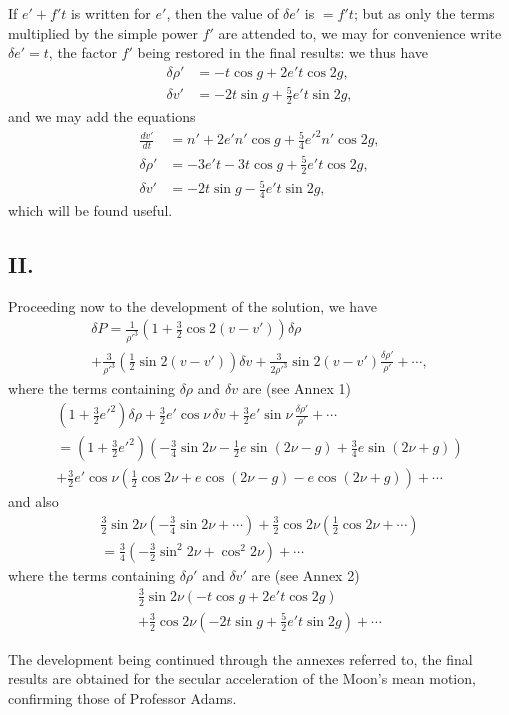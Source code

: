 \documentclass[11pt,a4paper]{article}
\begin{document}
If $e' + f't$ is written for $e'$, then the value of $\delta e'$ is $= f't$; but as only the terms multiplied by the simple power $f'$ are attended to, we may for convenience write $\delta e' = t$, the factor $f'$ being restored in the final results: we thus have
\begin{align*}
\delta\rho' &= -t\cos g + 2e't\cos 2g, \\
\delta v' &= -2t\sin g + \tfrac{5}{2}e't\sin 2g,
\end{align*}
and we may add the equations
\begin{align*}
\frac{dv'}{dt} &= n' + 2e'n'\cos g + \tfrac{5}{4}e'^2n'\cos 2g, \\
\delta\rho' &= -3e't - 3t\cos g + \tfrac{5}{2}e't\cos 2g, \\
\delta v' &= -2t\sin g - \tfrac{5}{4}e't\sin 2g,
\end{align*}
which will be found useful.

\subsection*{II.}

Proceeding now to the development of the solution, we have
\begin{multline}
\delta P = \frac{1}{\rho'^3}\left(1 + \tfrac{3}{2}\cos 2(v-v')\right)\delta\rho \\
+ \frac{3}{\rho'^3}\left(\tfrac{1}{2}\sin 2(v-v')\right)\delta v + \frac{3}{2\rho'^3}\sin 2(v-v')\frac{\delta\rho'}{\rho'} + \cdots,
\end{multline}
where the terms containing $\delta\rho$ and $\delta v$ are (see Annex 1)
\begin{multline*}
\left(1 + \tfrac{3}{2}e'^2\right)\delta\rho + \tfrac{3}{2}e'\cos\nu\,\delta v + \tfrac{3}{2}e'\sin\nu\,\frac{\delta\rho'}{\rho'} + \cdots \\
= \left(1 + \tfrac{3}{2}e'^2\right)\left(-\tfrac{3}{4}\sin 2\nu - \tfrac{1}{2}e\sin(2\nu-g) + \tfrac{3}{4}e\sin(2\nu+g)\right) \\
+ \tfrac{3}{2}e'\cos\nu\left(\tfrac{1}{2}\cos 2\nu + e\cos(2\nu-g) - e\cos(2\nu+g)\right) + \cdots
\end{multline*}
and also
\begin{multline*}
\tfrac{3}{2}\sin 2\nu\left(-\tfrac{3}{4}\sin 2\nu + \cdots\right) + \tfrac{3}{2}\cos 2\nu\left(\tfrac{1}{2}\cos 2\nu + \cdots\right) \\
= \tfrac{3}{4}\left(-\tfrac{3}{2}\sin^2 2\nu + \cos^2 2\nu\right) + \cdots
\end{multline*}
where the terms containing $\delta\rho'$ and $\delta v'$ are (see Annex 2)
\begin{multline*}
\tfrac{3}{2}\sin 2\nu\left(-t\cos g + 2e't\cos 2g\right) \\
+ \tfrac{3}{2}\cos 2\nu\left(-2t\sin g + \tfrac{5}{2}e't\sin 2g\right) + \cdots
\end{multline*}

The development being continued through the annexes referred to, the final results are obtained for the secular acceleration of the Moon's mean motion, confirming those of Professor Adams.
\end{document}
